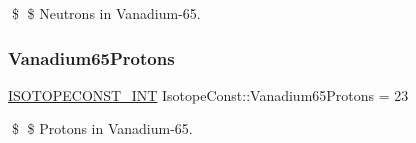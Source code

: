 \$ \$ Neutrons in Vanadium-\/65. \mbox{\label{group___isotope_const-_vanadium-_v65_ga966b4658af5c99de0475b290b545f120}} 
\subsubsection{\texorpdfstring{Vanadium65\+Protons}{Vanadium65Protons}}
{\footnotesize\ttfamily \mbox{\hyperlink{group___isotope_const-_macros_ga5f18360b3e99483a35c32d789e62621c}{I\+S\+O\+T\+O\+P\+E\+C\+O\+N\+S\+T\+\_\+\+I\+NT}} Isotope\+Const\+::\+Vanadium65\+Protons = 23}

\$ \$ Protons in Vanadium-\/65. 